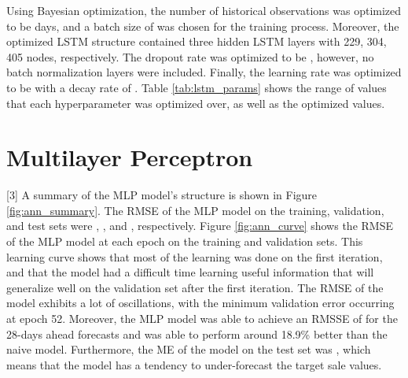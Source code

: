 Using Bayesian optimization, the number of historical observations was optimized to be \lstmParamsSteps{} days, and a batch size of \lstmParamsBatch{} was chosen for the training process. 
Moreover, the optimized LSTM structure contained three hidden LSTM layers with 229, 304, 405 nodes, respectively. 
The dropout rate was optimized to be \lstmParamsDropout{}, however, no batch normalization layers were included.
Finally, the learning rate was optimized to be \lstmParamsLR{} with a decay rate of \lstmParamsDecay{}. 
Table \ref{tab:lstm_params} shows the range of values that each hyperparameter was optimized over, as well as the optimized values.


\section{Multilayer Perceptron}
[3]
A summary of the MLP model's structure is shown in Figure \ref{fig:ann_summary}.
The RMSE of the MLP model on the training, validation, and test sets were \annTrnRMSE{}, \annValRMSE{}, and \annTstRMSE{}, respectively.
Figure \ref{fig:ann_curve} shows the RMSE of the MLP model at each epoch on the training and validation sets.
This learning curve shows that most of the learning was done on the first iteration, and that the model had a difficult time learning useful information that will generalize well on the validation set after the first iteration.
The RMSE of the model exhibits a lot of oscillations, with the minimum validation error occurring at epoch 52.
Moreover, the MLP model was able to achieve an RMSSE of \annTstMonRMSSE{} for the 28-days ahead forecasts and was able to perform around 18.9\% better than the naive model.
Furthermore, the ME of the model on the test set was \annTstME{}, which means that the model has a tendency to under-forecast the target sale values.

